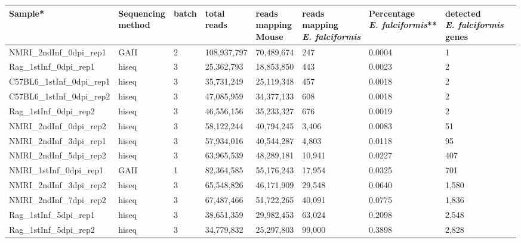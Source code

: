 \documentclass{bmcart}
\begin{document}
\begin{backmatter}
\begin{table}[ht]
\centering
\hspace*{-2.5cm}\begin{tabular}{lllllllll}
  \hline
Sample* & \bcell{Sequencing\\method} & batch & \bcell{total\\reads} & \bcell{reads\\mapping\\Mouse} & \bcell{reads\\mapping\\\textit{E. falciformis}} & \bcell{Percentage\\\textit{E. falciformis}}** & \bcell{detected\\ \textit{E. falciformis}\\genes} \\ 
  \hline
NMRI\_2ndInf\_0dpi\_rep1 & GAII & 2 & 108,937,797 & 70,489,674 & 247 & 0.0004 & 1 \\ 
  Rag\_1stInf\_0dpi\_rep1 & hiseq & 3 & 25,362,793 & 18,853,850 & 443 & 0.0023 & 2 \\ 
  C57BL6\_1stInf\_0dpi\_rep1 & hiseq & 3 & 35,731,249 & 25,119,348 & 457 & 0.0018 & 2 \\ 
  C57BL6\_1stInf\_0dpi\_rep2 & hiseq & 3 & 47,085,959 & 34,377,133 & 608 & 0.0018 & 2 \\ 
  Rag\_1stInf\_0dpi\_rep2 & hiseq & 3 & 46,556,156 & 35,233,327 & 676 & 0.0019 & 2 \\ 
  NMRI\_2ndInf\_0dpi\_rep2 & hiseq & 3 & 58,122,244 & 40,794,245 & 3,406 & 0.0083 & 51 \\ 
  \rowcolor{LightCyan}
  NMRI\_2ndInf\_3dpi\_rep1 & hiseq & 3 & 57,934,016 & 40,544,287 & 4,803 & 0.0118 & 95 \\ 
  \rowcolor{LightCyan}
  NMRI\_2ndInf\_5dpi\_rep2 & hiseq & 3 & 63,965,539 & 48,289,181 & 10,941 & 0.0227 & 407 \\ 
  \rowcolor{LightRed}
  NMRI\_1stInf\_0dpi\_rep1 & GAII & 1 & 82,364,585 & 55,176,243 & 17,954 & 0.0325 & 701 \\ 
  NMRI\_2ndInf\_3dpi\_rep2 & hiseq & 3 & 65,548,826 & 46,171,909 & 29,548 & 0.0640 & 1,580 \\ 
  NMRI\_2ndInf\_7dpi\_rep2 & hiseq & 3 & 67,487,466 & 51,722,265 & 40,091 & 0.0775 & 1,836 \\ 
  Rag\_1stInf\_5dpi\_rep1 & hiseq & 3 & 38,651,359 & 29,982,453 & 63,024 & 0.2098 & 2,548 \\ 
  Rag\_1stInf\_5dpi\_rep2 & hiseq & 3 & 34,779,832 & 25,297,803 & 99,000 & 0.3898 & 2,828 \\ 

\end{tabular}
\end{table}
\end{backmatter}
\end{document}
